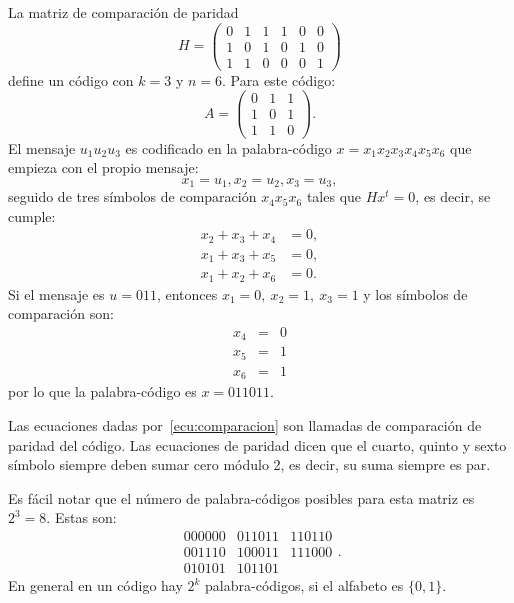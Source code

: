 \begin{ejemplo}
La matriz de comparación de paridad 
\[ H = \left(\begin{array}{ccc|ccc}
0 & 1 & 1 & 1 & 0 & 0 \\
1 & 0 & 1 & 0 & 1 & 0 \\
1 & 1 & 0 & 0 & 0 & 1
\end{array}\right) \] define un código con $k=3$ y $n=6$. Para este código: 
\[ A = \begin{pmatrix}
0 & 1 & 1\\
1 & 0 & 1 \\
1 & 1 & 0
\end{pmatrix}.  \]
El mensaje $u_1u_2u_3$ es codificado en la palabra-código $x = x_1x_2x_3x_4x_5x_6$ que empieza con el propio mensaje:
\[ x_1 = u_1, x_2 = u_2, x_3 = u_3, \] seguido de tres símbolos de comparación $x_4x_5x_6$ tales que $Hx^t = 0$, es decir, se cumple:
\begin{equation}\label{ecu:comparacion}
	\begin{split}
	x_2 + x_3 + x_4 &= 0,  \\
	x_1 + x_3 + x_5 &= 0,\\
	x_1 + x_2 + x_6 &= 0. 	
	\end{split}
\end{equation}
Si el mensaje es $u = 011$, entonces $x_1= 0,\  x_2 = 1, \ x_3 =1$ y los símbolos de comparación son:
\begin{eqnarray*}
x_4 & = & 0 \\
x_5 &=& 1 \\
x_6 &=& 1
\end{eqnarray*}
por lo que la palabra-código es $x = 011011$.
\end{ejemplo}
Las ecuaciones dadas por~\eqref{ecu:comparacion} son llamadas de comparación de paridad del código. Las ecuaciones de paridad dicen que el cuarto, quinto y sexto símbolo siempre deben sumar cero módulo 2, es decir, su suma siempre es par. 

Es fácil notar que el número de palabra-códigos posibles para esta matriz es $2^3 = 8$. Estas son:
\[ \begin{array}{ccc}
000000 & 011011 & 110110 \\
001110 & 100011 & 111000 \\
010101 & 101101 & 
\end{array}. \]
En general en un código hay $2^k$ palabra-códigos, si el alfabeto es $\{0,1\}$.

